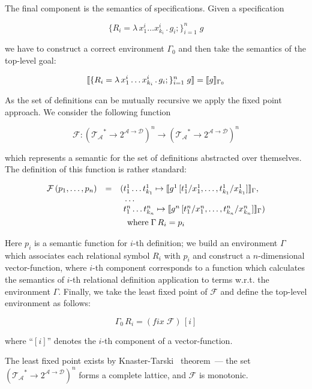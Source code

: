 The final component is the semantics of specifications. Given a specification

\[
\{R_i=\lambda\,x_1^i\dots x_{k_i}^i\,.\,g_i;\}_{i=1}^n\;g
\]

we have to construct a correct environment $\Gamma_0$ and then take the semantics of the top-level goal:

\[
\llbracket{\{R_i=\lambda\,x_1^i\dots x_{k_i}^i\,.\,g_i;\}_{i=1}^n\;g}\rrbracket=\llbracket{g}\rrbracket_{\Gamma_0}
\]

As the set of definitions can be mutually recursive we apply the fixed point approach. We consider the following
function

\[
\mathcal{F} : (\mathcal{T_A}^*\to 2^{\mathcal{A}\to\mathcal{D}})^n\to (\mathcal{T_A}^*\to 2^{\mathcal{A}\to\mathcal{D}})^n
\]

which represents a semantic for the set of definitions abstracted over themselves. The definition of this function is
rather standard:

\begin{gather*}
    \begin{array}{rcl}
      \mathcal{F}\,(p_1,\dots,p_n)& = &(t^1_1\dots t^1_{k_1}\mapsto\llbracket{g^1\,[t^1_1/x^1_1,\dots,t^1_{k_1}/x^1_{k_1}]}\rrbracket_\Gamma,\\
                                  &  &\phantom{(}\dots\\
                                  &  &\phantom{(}t^n_1\dots t^n_{k_n}\mapsto\llbracket{g^n\,[t^n_1/x^n_1,\dots,t^n_{k_n}/x^n_{k_n}]}\rrbracket_\Gamma)
    \end{array}\\
    \mbox{where}\;\Gamma\, R_i=p_i
\end{gather*}

Here $p_i$ is a semantic function for $i$-th definition; we build an environment $\Gamma$ which associates each relational symbol
$R_i$ with $p_i$ and construct a $n$-dimensional vector-function, where $i$-th component corresponds to a function which
calculates the semantics of $i$-th relational definition application to terms w.r.t. the environment $\Gamma$. Finally,
we take the least fixed point of $\mathcal{F}$ and define the top-level environment as follows:

\[
\Gamma_0\,R_i=(fix\;\mathcal{F})\,[i]
\]

where ``$[i]$'' denotes the $i$-th component of a vector-function.

The least fixed point exists by Knaster-Tarski~\cite{TarskiKnaster} theorem~--- the set $(\mathcal{T_A}^*\to 2^{\mathcal{A}\to\mathcal{D}})^n$
forms a complete lattice, and $\mathcal{F}$ is monotonic. 


